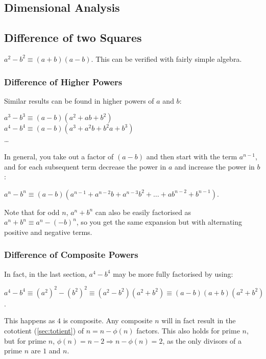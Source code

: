 \documentclass[a4paper,11pt]{article}
\begin{document}
    \subsection{Dimensional Analysis}

    \subsection{Difference of two Squares}

    $a^2 - b^2 \equiv (a + b)(a - b)$. This can be verified with fairly simple
    algebra.

    \subsubsection{Difference of Higher Powers}

    Similar results can be found in higher powers of $a$ and $b$:

    $a^3 - b^3 \equiv (a - b)(a^2 + ab + b^2)$
    \\$a^4 - b^4 \equiv (a - b)(a^3 + a^2b + b^2a + b^3)$
    \\\ldots

    In general, you take out a factor of $(a - b)$ and then start with the term
    $a^{n - 1}$, and for each subsequent term decrease the power in $a$ and
    increase the power in $b$:

    $a^n - b^n \equiv (a - b)(a^{n - 1} + a^{n - 2}b + a^{n - 3}b^2 + \ldots +
                              ab^{n - 2} + b^{n - 1})$.

    Note that for odd $n$, $a^n + b^n$ can also be easily factorised as
    $a^n + b^n \equiv a^n - (-b)^n$, so you get the same expansion but with
    alternating positive and negative terms.


    \subsubsection{Difference of Composite Powers}

    In fact, in the last section, $a^4 - b^4$ may be more fully factorised by
    using:

    $a^4 - b^4 \equiv (a^2)^2 - (b^2)^2 \equiv (a^2 - b^2)(a^2 + b^2) \equiv
        (a - b)(a + b)(a^2 + b^2)$.

    This happens as $4$ is composite. Any composite $n$ will in fact result in
    the cototient (\ref{sec:totient}) of $n = n - \phi(n)$ factors. This also
    holds for prime $n$, but for prime
    $n$, $\phi(n) = n - 2 \Rightarrow n - \phi(n) = 2$, as the only divisors of
    a prime $n$ are $1$ and $n$.
\end{document}
